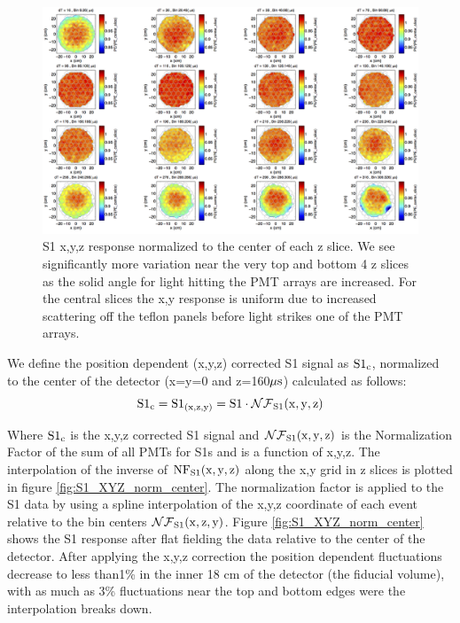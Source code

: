 \begin{figure}[h!]\centering
\includegraphics[width=150mm]{Chapter_XYZ_Corr/Thesis_Corr_Plots/S1_XYZ_Kr_norm_center_slice_crop.png}
\caption{S1 x,y,z response normalized to the center of each z slice. We see significantly more variation near the very top and bottom 4 z slices as the solid angle for light hitting the PMT arrays are increased. For the central slices the x,y response is uniform due to increased scattering off the teflon panels before light strikes one of the PMT arrays. }
\label{fig:S1_XYZ_norm_center_slice}
\end{figure}

We define the position dependent  (x,y,z) corrected S1 signal as $\rm S1{_c}$, normalized to the center of the detector (x=y=0 and z=160$\rm \mu s$) calculated as follows:
\begin{equation}
\rm S1_{c}= S1_{(x,z,y)}=S1 \cdot \mathcal{NF}_{S1}(x,y,z)
\label{eq:S1_XYZ}
\end{equation}

Where $\rm S1_{c}$ is the x,y,z corrected S1 signal and $\rm \mathcal{NF}_{S1}(x,y,z)$ is the Normalization Factor of the sum of all PMTs for S1s and is a function of x,y,z. The interpolation of the inverse of $\rm NF_{S1}(x,y,z)$ along the x,y grid in z slices is plotted in figure \ref{fig:S1_XYZ_norm_center}. The normalization factor is applied to the S1 data by using a spline interpolation of the x,y,z coordinate of each event relative to the bin centers $\rm \mathcal{NF}_{S1}(x,z,y)$. Figure \ref{fig:S1_XYZ_norm_center} shows the S1 response after flat fielding the data relative to the center of the detector. After applying the x,y,z correction the position dependent fluctuations decrease to less than1\% in the inner 18 cm of the detector (the fiducial volume), with as much as 3\% fluctuations near the top and bottom edges were the interpolation breaks down.

